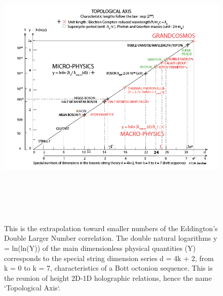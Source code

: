 \documentclass[a4paper,9pt]{article}
\begin{document}
\begin{appendix}
\begin{table}
\begin{tabular}{llll}
    \bottomrule
  \end{tabular}
\end{table}


% 

\begin{figure}
\label{tab:9:table9}
\centering
\includegraphics[width=\textwidth,height=14cm]{./figure/figure}
\caption[The Topological Axis]
{This is the extrapolation toward smaller numbers of the Eddington's Double Larger Number correlation. The double natural logarithms y = ln(ln(Y)) of the main dimensionless physical quantities (Y) corresponds to the special string dimension series d = 4k + 2, from k = 0 to k = 7, characteristics of a Bott octonion sequence. This is the reunion of height 2D-1D holographic relations, hence the name `Topological Axis`.}

\end{figure}
\end{appendix}
\end{document}
